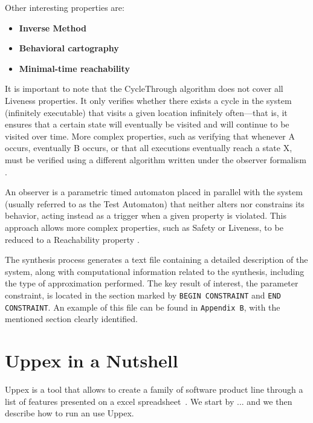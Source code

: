 Other interesting properties are:

\begin{itemize}
    \item \textbf{Inverse Method} 

    \item \textbf{Behavioral cartography} 

    \item \textbf{Minimal-time reachability}


\end{itemize}

It is important to note that the CycleThrough algorithm does not cover all Liveness properties. It only verifies whether there exists a cycle in the system (infinitely executable) that visits a given location infinitely often—that is, it ensures that a certain state will eventually be visited and will continue to be visited over time. More complex properties, such as verifying that whenever A occurs, eventually B occurs, or that all executions eventually reach a state X, must be verified using a different algorithm written under the observer formalism \cite{IMITATOR}.

An observer is a parametric timed automaton placed in parallel with the system (usually referred to as the Test Automaton) that neither alters nor constrains its behavior, acting instead as a trigger when a given property is violated. This approach allows more complex properties, such as Safety or Liveness, to be reduced to a Reachability property \cite{observers}.


The synthesis process generates a text file containing a detailed description of the system, along with computational information related to the synthesis, including the type of approximation performed. The key result of interest, the parameter constraint, is located in the section marked by \texttt{BEGIN CONSTRAINT} and \texttt{END CONSTRAINT}. An example of this file can be found in \texttt{Appendix B}, with the mentioned section clearly identified.


\section{Uppex in a Nutshell}

Uppex is a tool that allows to create a family of software product line through a list of features presented on a excel spreadsheet~\cite{uppex}. We start by ... and we then describe how to run an use Uppex.

